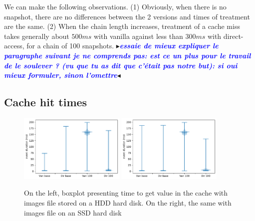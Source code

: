 \documentclass[sigplan,screen,10pt]{acmart}
\newcommand{\mynote}[2]{\fbox{\bfseries\sffamily\footnotesize{\textbf{#1}}}
 {\small$\blacktriangleright$\textsf{\emph{#2}}$\blacktriangleleft$}}
\newcommand{\mynote}[2]{}
\newcommand{\stella}[1]{\mynote{\textcolor{red}{Stella}}{\textcolor{blue}{\textbf{#1}}}}
\begin{document}
	We can make the following observations.
	(1) Obviously, when there is no snapshot, there are no differences between the 2 versions and times of treatment are the same.
	(2) When the chain length increases, treatment of a cache miss takes generally about $500 ms$ with vanilla against less than $300 ms$ with direct-access, for a chain of 100 snapshots.
	\stella{essaie de mieux expliquer le paragraphe suivant je ne comprends pas: est ce un plus pour le travail de le soulever ? (vu que tu as dit que c'était pas notre but): si oui mieux formuler, sinon l'omettre}
	
	\subsection*{Cache hit times}
	
	\begin{figure}[h]
		\center
		\includegraphics[width=0.45\textwidth]{HIT_time_hdd.pdf}
		\includegraphics[width=0.45\textwidth]{HIT_time_ssd.pdf}
		\caption{On the left, boxplot presenting time to get value in the cache with images file stored on a HDD hard disk. On the right, the same with images file on an SSD hard disk}
		\label{fig:fig_b}
	\end{figure}
\end{document}

